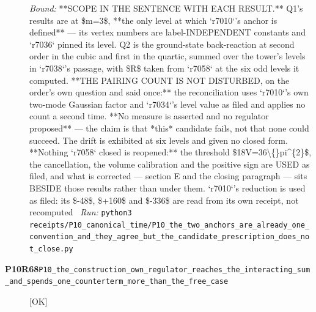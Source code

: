 \begin{description}
 \emph{Bound:}  **SCOPE IN THE SENTENCE WITH EACH RESULT.** Q1's results are at \$m=3\$, **the only level at which `r7010`'s anchor is defined** --- its vertex numbers are label-INDEPENDENT constants and `r7036` pinned its level. Q2 is the ground-state back-reaction at second order in the cubic and first in the quartic, summed over the tower's levels in `r7038`'s passage, with \$R\$ taken from `r7058` at the six odd levels it computed.  **THE PAIRING COUNT IS NOT DISTURBED, on the order's own question and said once:** the reconciliation uses `r7010`'s own two-mode Gaussian factor and `r7034`'s level value as filed and applies no count a second time. **No measure is asserted and no regulator proposed** --- the claim is that *this* candidate fails, not that none could succeed. The drift is exhibited at six levels and given no closed form. **Nothing `r7058` closed is reopened:** the threshold \$18V=36\textbackslash\{\}pi\textasciicircum{}\{2\}\$, the cancellation, the volume calibration and the positive sign are USED as filed, and what is corrected --- section E and the closing paragraph --- sits BESIDE those results rather than under them. `r7010`'s reduction is used as filed: its \$-48\$, \$+160\$ and \$-336\$ are read from its own receipt, not recomputed
\ \emph{Run:} \texttt{python3 receipts/P10\_canonical\_time/P10\_the\_two\_anchors\_are\_already\_one\_convention\_and\_they\_agree\_but\_the\_candidate\_prescription\_does\_not\_close.py}
\item[\rcptlabel{P10_the_construction_own_regulator_reaches_the_interacting_sum_and_spends_one_counterterm_more_than_the_free_case}{P10R68}\textbf{P10R68}\quad\texttt{P10\_the\_construction\_own\_regulator\_reaches\_the\_interacting\_sum\_and\_spends\_one\_counterterm\_more\_than\_the\_free\_case}]\hfill\textsf{[OK]}\\

\end{description}
